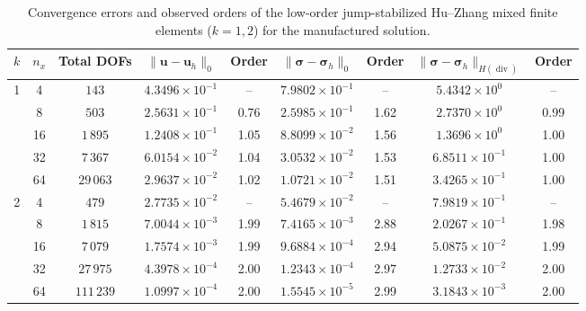 \begin{table}[htbp]
\centering
\caption{Convergence errors and observed orders of the low-order jump-stabilized Hu--Zhang mixed finite elements ($k=1,2$) for the manufactured solution.}
\label{tab:convergence_low_order}
\small
\setlength{\tabcolsep}{4pt}
\begin{tabular}{ccccccccc}
\toprule
$k$ & $n_x$ & Total DOFs & $\|\boldsymbol{u}-\boldsymbol{u}_h\|_0$ & Order & $\|\boldsymbol{\sigma}-\boldsymbol{\sigma}_h\|_0$ & Order & $\|\boldsymbol{\sigma}-\boldsymbol{\sigma}_h\|_{H(\operatorname{div})}$ & Order \\
\midrule
1 & 4  & $143$      & $4.3496\times10^{-1}$ & --   & $7.9802\times10^{-1}$ & --   & $5.4342\times10^{0}$  & --   \\
  & 8  & $503$      & $2.5631\times10^{-1}$ & 0.76 & $2.5985\times10^{-1}$ & 1.62 & $2.7370\times10^{0}$  & 0.99 \\
  & 16 & $1\,895$   & $1.2408\times10^{-1}$ & 1.05 & $8.8099\times10^{-2}$ & 1.56 & $1.3696\times10^{0}$  & 1.00 \\
  & 32 & $7\,367$   & $6.0154\times10^{-2}$ & 1.04 & $3.0532\times10^{-2}$ & 1.53 & $6.8511\times10^{-1}$ & 1.00 \\
  & 64 & $29\,063$  & $2.9637\times10^{-2}$ & 1.02 & $1.0721\times10^{-2}$ & 1.51 & $3.4265\times10^{-1}$ & 1.00 \\
\midrule
2 & 4  & $479$      & $2.7735\times10^{-2}$ & --   & $5.4679\times10^{-2}$ & --   & $7.9819\times10^{-1}$ & --   \\
  & 8  & $1\,815$   & $7.0044\times10^{-3}$ & 1.99 & $7.4165\times10^{-3}$ & 2.88 & $2.0267\times10^{-1}$ & 1.98 \\
  & 16 & $7\,079$   & $1.7574\times10^{-3}$ & 1.99 & $9.6884\times10^{-4}$ & 2.94 & $5.0875\times10^{-2}$ & 1.99 \\
  & 32 & $27\,975$  & $4.3978\times10^{-4}$ & 2.00 & $1.2343\times10^{-4}$ & 2.97 & $1.2733\times10^{-2}$ & 2.00 \\
  & 64 & $111\,239$ & $1.0997\times10^{-4}$ & 2.00 & $1.5545\times10^{-5}$ & 2.99 & $3.1843\times10^{-3}$ & 2.00 \\
\bottomrule
\end{tabular}
\end{table}

